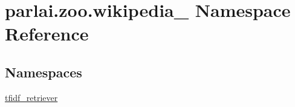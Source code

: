 \hypertarget{namespaceparlai_1_1zoo_1_1wikipedia__20161221}{}\section{parlai.\+zoo.\+wikipedia\+\_ Namespace Reference}
\label{namespaceparlai_1_1zoo_1_1wikipedia__20161221}
\subsection*{Namespaces}
\begin{DoxyCompactItemize}
\item 
 \hyperlink{namespaceparlai_1_1zoo_1_1wikipedia__20161221_1_1tfidf__retriever}{tfidf\+\_\+retriever}
\end{DoxyCompactItemize}
